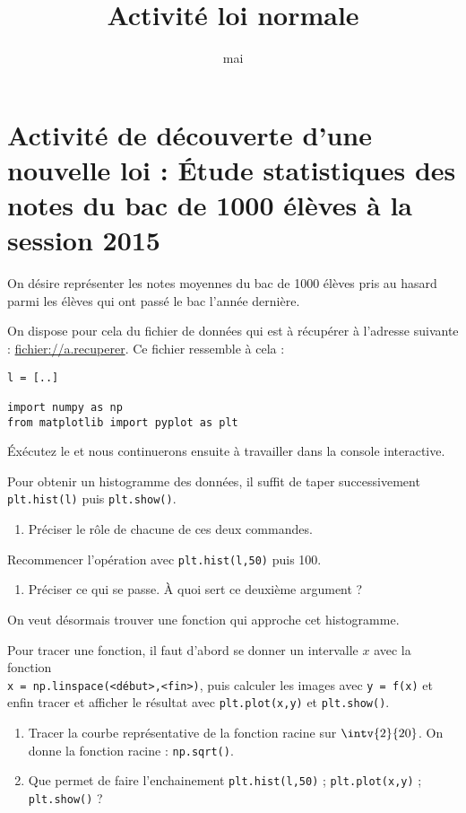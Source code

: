 \documentclass[12pt,french]{article}
\title{Activité loi normale}
\date{mai \the\year}
\author{\bsc{Jumel}}
\begin{document}
\maketitle

\section*{Activité de découverte d'une nouvelle loi : Étude statistiques
des notes du bac de 1000 élèves à la session 2015}

On désire représenter les notes moyennes du bac de 1000 élèves pris au
hasard parmi les élèves qui ont passé le bac l'année dernière.

On dispose pour cela du fichier de données qui est à récupérer à
l'adresse suivante : \url{fichier://a.recuperer}. Ce fichier ressemble à
cela :
\begin{verbatim}
l = [..]

import numpy as np
from matplotlib import pyplot as plt
\end{verbatim}

Éxécutez le et nous continuerons ensuite à travailler dans la console
interactive.

Pour obtenir un histogramme des données, il suffit de taper
successivement \texttt{plt.hist(l)} puis \texttt{plt.show()}.

\begin{enumerate}
  \item Préciser le rôle de chacune de ces deux commandes.
\end{enumerate}

Recommencer l'opération avec \texttt{plt.hist(l,50)} puis 100.

\begin{enumerate}[resume*]
  \item Préciser ce qui se passe. À quoi sert ce deuxième argument ?
\end{enumerate}

On veut désormais trouver une fonction qui approche cet histogramme.

Pour tracer une fonction, il faut d'abord se donner un intervalle $x$
avec la fonction \\
\texttt{x = np.linspace(<début>,<fin>)}, puis calculer
les images avec \texttt{y = f(x)} et enfin tracer et afficher le
résultat avec \texttt{plt.plot(x,y)} et \texttt{plt.show()}.

\begin{enumerate}[resume*]
  \item Tracer la courbe représentative de la fonction racine sur
    $\intv{2}{20}$. On donne la fonction racine : \texttt{np.sqrt()}.
  \item Que permet de faire l'enchainement \texttt{plt.hist(l,50)} ;
    \texttt{plt.plot(x,y)} ; \texttt{plt.show()} ?
\end{enumerate}
\end{document}
